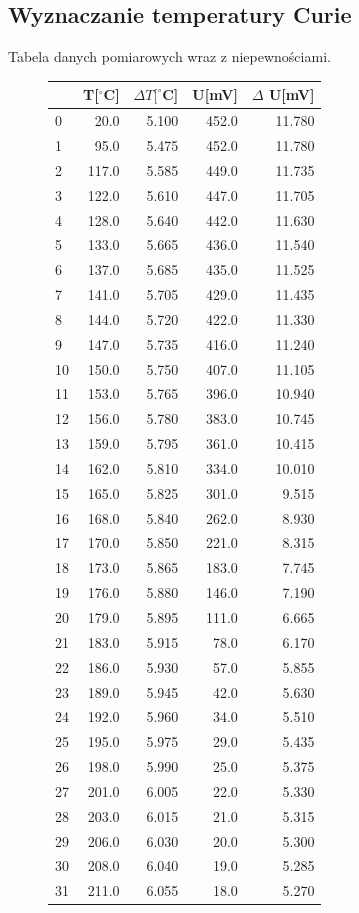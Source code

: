 \documentclass[a4paper,10pt]{article}
\begin{document}
\subsection{Wyznaczanie temperatury Curie}
Tabela danych pomiarowych wraz z niepewnościami.
\begin{figure}[H]
\begin{tabular}{lrrrr}
\hline
{} &T[$^\circ$C]&$\Delta T[^\circ$C]&U[mV]&$\Delta$ U[mV]\\
\hline
0  &   20.0 &  5.100 &  452.0 &  11.780 \\
1  &   95.0 &  5.475 &  452.0 &  11.780 \\
2  &  117.0 &  5.585 &  449.0 &  11.735 \\
3  &  122.0 &  5.610 &  447.0 &  11.705 \\
4  &  128.0 &  5.640 &  442.0 &  11.630 \\
5  &  133.0 &  5.665 &  436.0 &  11.540 \\
6  &  137.0 &  5.685 &  435.0 &  11.525 \\
7  &  141.0 &  5.705 &  429.0 &  11.435 \\
8  &  144.0 &  5.720 &  422.0 &  11.330 \\
9  &  147.0 &  5.735 &  416.0 &  11.240 \\
10 &  150.0 &  5.750 &  407.0 &  11.105 \\
11 &  153.0 &  5.765 &  396.0 &  10.940 \\
12 &  156.0 &  5.780 &  383.0 &  10.745 \\
13 &  159.0 &  5.795 &  361.0 &  10.415 \\
14 &  162.0 &  5.810 &  334.0 &  10.010 \\
15 &  165.0 &  5.825 &  301.0 &   9.515 \\
16 &  168.0 &  5.840 &  262.0 &   8.930 \\
17 &  170.0 &  5.850 &  221.0 &   8.315 \\
18 &  173.0 &  5.865 &  183.0 &   7.745 \\
19 &  176.0 &  5.880 &  146.0 &   7.190 \\
20 &  179.0 &  5.895 &  111.0 &   6.665 \\
21 &  183.0 &  5.915 &   78.0 &   6.170 \\
22 &  186.0 &  5.930 &   57.0 &   5.855 \\
23 &  189.0 &  5.945 &   42.0 &   5.630 \\
24 &  192.0 &  5.960 &   34.0 &   5.510 \\
25 &  195.0 &  5.975 &   29.0 &   5.435 \\
26 &  198.0 &  5.990 &   25.0 &   5.375 \\
27 &  201.0 &  6.005 &   22.0 &   5.330 \\
28 &  203.0 &  6.015 &   21.0 &   5.315 \\
29 &  206.0 &  6.030 &   20.0 &   5.300 \\
30 &  208.0 &  6.040 &   19.0 &   5.285 \\
31 &  211.0 &  6.055 &   18.0 &   5.270 \\
\hline
\end{tabular}
\end{figure}
\end{document}
